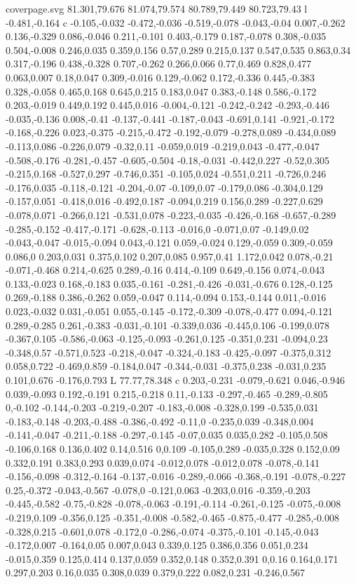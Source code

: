 \begin{filecontents}[noheader]{coverpage.svg}
81.301,79.676 81.074,79.574 80.789,79.449 80.723,79.43 l -0.481,-0.164 c -0.105,-0.032 -0.472,-0.036 -0.519,-0.078 -0.043,-0.04 0.007,-0.262 0.136,-0.329 0.086,-0.046 0.211,-0.101 0.403,-0.179 0.187,-0.078 0.308,-0.035 0.504,-0.008 0.246,0.035 0.359,0.156 0.57,0.289 0.215,0.137 0.547,0.535 0.863,0.34 0.317,-0.196 0.438,-0.328 0.707,-0.262 0.266,0.066 0.77,0.469 0.828,0.477 0.063,0.007 0.18,0.047 0.309,-0.016 0.129,-0.062 0.172,-0.336 0.445,-0.383 0.328,-0.058 0.465,0.168 0.645,0.215 0.183,0.047 0.383,-0.148 0.586,-0.172 0.203,-0.019 0.449,0.192 0.445,0.016 -0.004,-0.121 -0.242,-0.242 -0.293,-0.446 -0.035,-0.136 0.008,-0.41 -0.137,-0.441 -0.187,-0.043 -0.691,0.141 -0.921,-0.172 -0.168,-0.226 0.023,-0.375 -0.215,-0.472 -0.192,-0.079 -0.278,0.089 -0.434,0.089 -0.113,0.086 -0.226,0.079 -0.32,0.11 -0.059,0.019 -0.219,0.043 -0.477,-0.047 -0.508,-0.176 -0.281,-0.457 -0.605,-0.504 -0.18,-0.031 -0.442,0.227 -0.52,0.305 -0.215,0.168 -0.527,0.297 -0.746,0.351 -0.105,0.024 -0.551,0.211 -0.726,0.246 -0.176,0.035 -0.118,-0.121 -0.204,-0.07 -0.109,0.07 -0.179,0.086 -0.304,0.129 -0.157,0.051 -0.418,0.016 -0.492,0.187 -0.094,0.219 0.156,0.289 -0.227,0.629 -0.078,0.071 -0.266,0.121 -0.531,0.078 -0.223,-0.035 -0.426,-0.168 -0.657,-0.289 -0.285,-0.152 -0.417,-0.171 -0.628,-0.113 -0.016,0 -0.071,0.07 -0.149,0.02 -0.043,-0.047 -0.015,-0.094 0.043,-0.121 0.059,-0.024 0.129,-0.059 0.309,-0.059 0.086,0 0.203,0.031 0.375,0.102 0.207,0.085 0.957,0.41 1.172,0.042 0.078,-0.21 -0.071,-0.468 0.214,-0.625 0.289,-0.16 0.414,-0.109 0.649,-0.156 0.074,-0.043 0.133,-0.023 0.168,-0.183 0.035,-0.161 -0.281,-0.426 -0.031,-0.676 0.128,-0.125 0.269,-0.188 0.386,-0.262 0.059,-0.047 0.114,-0.094 0.153,-0.144 0.011,-0.016 0.023,-0.032 0.031,-0.051 0.055,-0.145 -0.172,-0.309 -0.078,-0.477 0.094,-0.121 0.289,-0.285 0.261,-0.383 -0.031,-0.101 -0.339,0.036 -0.445,0.106 -0.199,0.078 -0.367,0.105 -0.586,-0.063 -0.125,-0.093 -0.261,0.125 -0.351,0.231 -0.094,0.23 -0.348,0.57 -0.571,0.523 -0.218,-0.047 -0.324,-0.183 -0.425,-0.097 -0.375,0.312 0.058,0.722 -0.469,0.859 -0.184,0.047 -0.344,-0.031 -0.375,0.238 -0.031,0.235 0.101,0.676 -0.176,0.793 L 77.77,78.348 c 0.203,-0.231 -0.079,-0.621 0.046,-0.946 0.039,-0.093 0.192,-0.191 0.215,-0.218 0.11,-0.133 -0.297,-0.465 -0.289,-0.805 0,-0.102 -0.144,-0.203 -0.219,-0.207 -0.183,-0.008 -0.328,0.199 -0.535,0.031 -0.183,-0.148 -0.203,-0.488 -0.386,-0.492 -0.11,0 -0.235,0.039 -0.348,0.004 -0.141,-0.047 -0.211,-0.188 -0.297,-0.145 -0.07,0.035 0.035,0.282 -0.105,0.508 -0.106,0.168 0.136,0.402 0.14,0.516 0,0.109 -0.105,0.289 -0.035,0.328 0.152,0.09 0.332,0.191 0.383,0.293 0.039,0.074 -0.012,0.078 -0.012,0.078 -0.078,-0.141 -0.156,-0.098 -0.312,-0.164 -0.137,-0.016 -0.289,-0.066 -0.368,-0.191 -0.078,-0.227 0.25,-0.372 -0.043,-0.567 -0.078,0 -0.121,0.063 -0.203,0.016 -0.359,-0.203 -0.445,-0.582 -0.75,-0.828 -0.078,-0.063 -0.191,-0.114 -0.261,-0.125 -0.075,-0.008 -0.219,0.109 -0.356,0.125 -0.351,-0.008 -0.582,-0.465 -0.875,-0.477 -0.285,-0.008 -0.328,0.215 -0.601,0.078 -0.172,0 -0.286,-0.074 -0.375,-0.101 -0.145,-0.043 -0.172,0.007 -0.164,0.05 0.007,0.043 0.339,0.125 0.386,0.356 0.051,0.234 -0.015,0.359 0.125,0.414 0.137,0.059 0.352,0.148 0.352,0.391 0,0.16 0.164,0.171 0.297,0.203 0.16,0.035 0.308,0.039 0.379,0.222 0.082,0.231 -0.246,0.567 
\end{filecontents}

